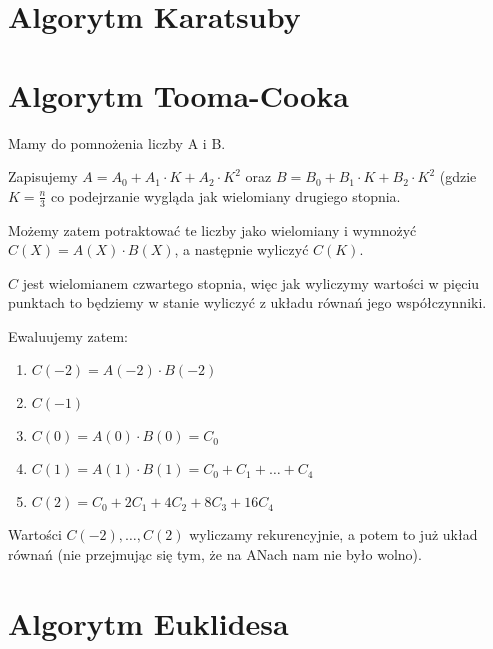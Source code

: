 \section{Algorytm Karatsuby}

\section{Algorytm Tooma-Cooka}

Mamy do pomnożenia liczby A i B.

Zapisujemy \( A = A_0 + A_1 \cdot K + A_2 \cdot K^2 \) oraz \( B = B_0 + B_1 \cdot K + B_2 \cdot K^2 \) (gdzie \( K = \frac{n}{3} \) co podejrzanie wygląda jak wielomiany drugiego stopnia.

Możemy zatem potraktować te liczby jako wielomiany i wymnożyć \( C(X) = A(X) \cdot B(X) \), a następnie wyliczyć \( C(K) \).

\( C \) jest wielomianem czwartego stopnia, więc jak wyliczymy wartości w pięciu punktach to będziemy w stanie wyliczyć z układu równań jego współczynniki.

Ewaluujemy zatem:
\begin{enumerate}
    \item \( C(-2) = A(-2) \cdot B(-2) \)
    \item \( C(-1) \)
    \item \( C(0) = A(0) \cdot B(0) = C_0 \)
    \item \( C(1) = A(1) \cdot B(1) = C_0 + C_1 + \dots + C_4 \)
    \item \( C(2) = C_0 + 2 C_1 + 4 C_2 + 8 C_3 + 16 C_4 \)
\end{enumerate}

Wartości \( C(-2), \dots, C(2) \) wyliczamy rekurencyjnie, a potem to już układ równań (nie przejmując się tym, że na ANach nam nie było wolno).

\section{Algorytm Euklidesa}